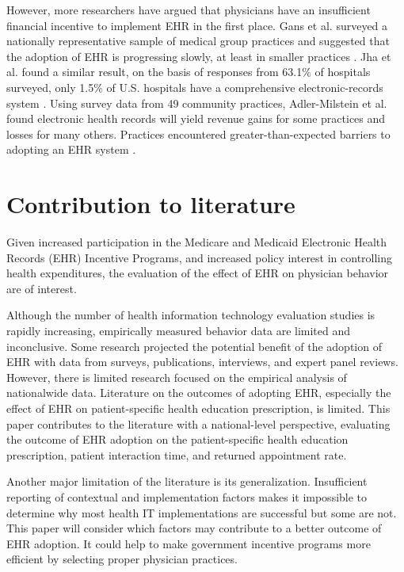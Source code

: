 \documentclass[12pt]{report}
\begin{document}
However, more researchers have argued that physicians have an insufficient financial incentive to implement EHR in the first place. Gans et al. surveyed a nationally representative sample of medical group practices and suggested that the adoption of EHR is progressing slowly, at least in smaller practices \citep{Gans2005}. Jha et al. found a similar result, on the basis of responses from 63.1\% of hospitals surveyed, only 1.5\% of U.S. hospitals have a comprehensive electronic-records system \citep{Jha2009}. Using survey data from 49 community practices, Adler-Milstein et al. found electronic health records will yield revenue gains for some practices and losses for many others. Practices encountered greater-than-expected barriers to adopting an EHR system \citep{Adler-Milstein2012}.

\section{Contribution to literature}

Given increased participation in the Medicare and Medicaid Electronic Health Records (EHR) Incentive Programs, and increased policy interest in controlling health expenditures, the evaluation of the effect of EHR on physician behavior are of interest.

Although the number of health information technology evaluation studies is rapidly increasing, empirically measured behavior data are limited and inconclusive. Some research projected the potential benefit of the adoption of EHR with data from surveys, publications, interviews, and expert panel reviews. However, there is limited research focused on the empirical analysis of nationalwide data. Literature on the outcomes of adopting EHR, especially the effect of EHR on patient-specific health education prescription, is limited. This paper contributes to the literature with a national-level perspective, evaluating the outcome of EHR adoption on the patient-specific health education prescription, patient interaction time, and returned appointment rate.

Another major limitation of the literature is its generalization. Insufficient reporting of contextual and implementation factors makes it impossible to determine why most health IT implementations are successful but some are not. This paper will consider which factors may contribute to a better outcome of EHR adoption. It could help to make government incentive programs more efficient by selecting proper physician practices.
\end{document}

